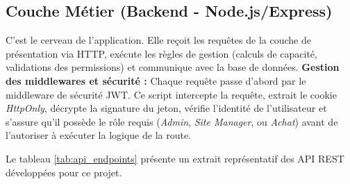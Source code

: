 \subsection{Couche Métier (Backend - Node.js/Express)}
C'est le cerveau de l'application. Elle reçoit les requêtes de la couche de présentation via HTTP, exécute les règles de gestion (calculs de capacité, validations des permissions) et communique avec la base de données.
\newline
\textbf{Gestion des middlewares et sécurité :} Chaque requête passe d'abord par le middleware de sécurité JWT. Ce script intercepte la requête, extrait le cookie \textit{HttpOnly}, décrypte la signature du jeton, vérifie l'identité de l'utilisateur et s'assure qu'il possède le rôle requis (\textit{Admin}, \textit{Site Manager}, ou \textit{Achat}) avant de l'autoriser à exécuter la logique de la route.

Le tableau \ref{tab:api_endpoints} présente un extrait représentatif des API REST développées pour ce projet.

